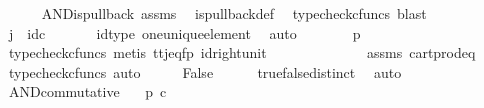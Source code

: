\begin{isabellebody}
\ \ \ \ \isamarkupfalse%
\ AND{\isacharunderscore}{\kern0pt}is{\isacharunderscore}{\kern0pt}pullback\ assms\ \isamarkupfalse%
\ is{\isacharunderscore}{\kern0pt}pullback{\isacharunderscore}{\kern0pt}def\ \isamarkupfalse%
\ {\isacharparenleft}{\kern0pt}typecheck{\isacharunderscore}{\kern0pt}cfuncs{\isacharcomma}{\kern0pt}\ blast{\isacharparenright}{\kern0pt}\isanewline
\ \ \isamarkupfalse%
\ \isamarkupfalse%
\ {\isachardoublequoteopen}j\ {\isacharequal}{\kern0pt}\ id\isactrlsub c\ {\isasymone}{\isachardoublequoteclose}\isanewline
\ \ \ \ \isamarkupfalse%
\ id{\isacharunderscore}{\kern0pt}type\ one{\isacharunderscore}{\kern0pt}unique{\isacharunderscore}{\kern0pt}element\ \isamarkupfalse%
\ auto\isanewline
\ \ \isamarkupfalse%
\ \isamarkupfalse%
\ {\isachardoublequoteopen}{\isasymlangle}{\isasymt}{\isacharcomma}{\kern0pt}{\isasymt}{\isasymrangle}\ {\isacharequal}{\kern0pt}\ {\isasymlangle}p{\isacharcomma}{\kern0pt}{\isasymf}{\isasymrangle}{\isachardoublequoteclose}\isanewline
\ \ \ \ \isamarkupfalse%
\ {\isacharparenleft}{\kern0pt}typecheck{\isacharunderscore}{\kern0pt}cfuncs{\isacharcomma}{\kern0pt}\ metis\ tt{\isacharunderscore}{\kern0pt}j{\isacharunderscore}{\kern0pt}eq{\isacharunderscore}{\kern0pt}fp\ id{\isacharunderscore}{\kern0pt}right{\isacharunderscore}{\kern0pt}unit{}{\isacharparenright}{\kern0pt}\isanewline
\ \ \isamarkupfalse%
\ \isamarkupfalse%
\ {\isachardoublequoteopen}{\isasymt}\ {\isacharequal}{\kern0pt}\ {\isasymf}{\isachardoublequoteclose}\isanewline
\ \ \ \ \isamarkupfalse%
\ assms\ cart{\isacharunderscore}{\kern0pt}prod{\isacharunderscore}{\kern0pt}eq{}\ \isamarkupfalse%
\ {\isacharparenleft}{\kern0pt}typecheck{\isacharunderscore}{\kern0pt}cfuncs{\isacharcomma}{\kern0pt}\ auto{\isacharparenright}{\kern0pt}\isanewline
\ \ \isamarkupfalse%
\ \isamarkupfalse%
\ {\isachardoublequoteopen}False{\isachardoublequoteclose}\isanewline
\ \ \ \ \isamarkupfalse%
\ true{\isacharunderscore}{\kern0pt}false{\isacharunderscore}{\kern0pt}distinct\ \isamarkupfalse%
\ auto\isanewline
{}\isamarkupfalse%
%
\endisatagproof
{\isafoldproof}%
%
\isadelimproof
\isanewline
%
\endisadelimproof
\isanewline
{}\isamarkupfalse%
\ AND{\isacharunderscore}{\kern0pt}commutative{\isacharcolon}{\kern0pt}\isanewline
\ \ \ {\isachardoublequoteopen}p\ {\isasymin}\isactrlsub c\ {\isasymOmega}{\isachardoublequoteclose}\isanewline

\end{isabellebody}
